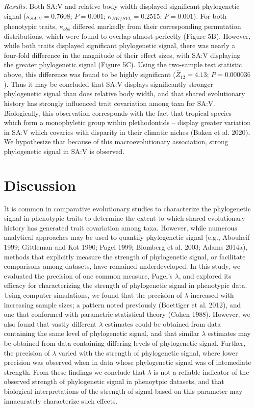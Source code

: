 \documentclass[
]{article}
\begin{document}
{\emph{Results.} Both SA:V and relative body width displayed significant
phylogenetic signal (\(\kappa_{SA:V}=0.7608\); \(P=0.001\);
\(\kappa_{BW/SVL}=0.2515\); \(P=0.001\)). For both phenotypic traits,
\(\kappa_{obs}\) differed markedly from their corresponding permutation
distributions, which were found to overlap almost perfectly (Figure 5B).
However, while both traits displayed significant phylogenetic signal,
there was nearly a four-fold difference in the magnitude of their effect
sizes, with SA:V displaying the greater phylogenetic signal (Figure 5C).
Using the two-sample test statistic above, this difference was found to
be highly significant (\(\hat{Z}_{12}=4.13\); \(P=0.000036\)). Thus it
may be concluded that SA:V displays significantly stronger phylogenetic
signal than does relative body width, and that shared evolutionary
history has strongly influenced trait covariation among taxa for SA:V.
Biologically, this observation corresponds with the fact that tropical
species -- which form a monophyletic group within plethodontids --
display greater variation in SA:V which covaries with disparity in their
climatic niches (Baken et al. 2020). We hypothesize that because of this
macroevolutionary association, strong phylogenetic signal in SA:V is
observed.

\hypertarget{discussion}{%
\section{Discussion}\label{discussion}}

It is common in comparative evolutionary studies to characterize the
phylogenetic signal in phenotypic traits to determine the extent to
which shared evolutionary history has generated trait covariation among
taxa. However, while numerous analytical approaches may be used to
quantify phylogenetic signal (e.g., Abouheif 1999; Gittleman and Kot
1990; Pagel 1999; Blomberg et al. 2003; Adams 2014a), methods that
explicitly measure the strength of phylogenetic signal, or facilitate
comparisons among datasets, have remained underdeveloped. In this study,
we evaluated the precision of one common measure, Pagel's \(\lambda\),
and explored its efficacy for characterizing the strength of
phylogenetic signal in phenotypic data. Using computer simulations, we
found that the precision of \(\lambda\) increased with increasing sample
sizes; a pattern noted previously (Boettiger et al. 2012), and one that
conformed with parametric statistical theory (Cohen 1988). However, we
also found that vastly different \(\lambda\) estimates could be obtained
from data containing the same level of phylogenetic signal, and that
similar \(\lambda\) estimates may be obtained from data containing
differing levels of phylogenetic signal. Further, the precision of
\(\lambda\) varied with the strength of phylogenetic signal, where lower
precision was observed when in data whose phylogenetic signal was of
intemediate strength. From these findings we conclude that \(\lambda\)
is not a reliable indicator of the observed strength of phylogenetic
signal in phenoytpic datasets, and that biological interpretations of
the strength of signal based on this parameter may innacurately
characterize such effects. \hfill\break

}
\end{document}
